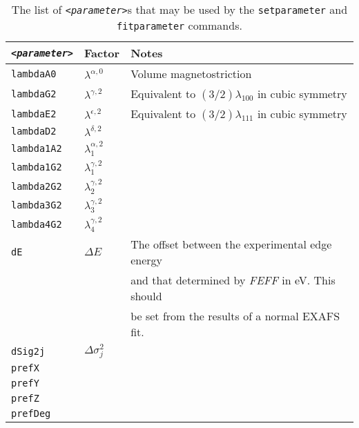 \documentclass[a4paper,12pt]{report}
\newcommand{\feff}{\emph{FEFF} }
\begin{document}
\begin{table}
\begin{tabular}{lll}
\texttt{\emph{<parameter>}} & Factor & Notes \\
\hline
 \verb|lambdaA0| & $\lambda^{\alpha,0}$ & Volume magnetostriction \\
 \verb|lambdaG2| & $\lambda^{\gamma,2}$ & Equivalent to $(3/2)\lambda_{100}$ in cubic symmetry \\
 \verb|lambdaE2| & $\lambda^{\epsilon,2}$ & Equivalent to $(3/2)\lambda_{111}$ in cubic symmetry \\
 \verb|lambdaD2| & $\lambda^{\delta,2}$ & \\
 \verb|lambda1A2| & $\lambda_1^{\alpha,2}$ & \\
 \verb|lambda1G2| & $\lambda_1^{\gamma,2}$ & \\
 \verb|lambda2G2| & $\lambda_2^{\gamma,2}$ & \\
 \verb|lambda3G2| & $\lambda_3^{\gamma,2}$ & \\
 \verb|lambda4G2| & $\lambda_4^{\gamma,2}$ & \\
 \verb|dE| & $\Delta E$ & The offset between the experimental edge energy \\
& & and that determined by \feff in eV. This should\\
& & be set from the results of a normal EXAFS fit.\\

 \verb|dSig2j| & $\Delta\sigma_j^2$ \\
 \verb|prefX| & \\
 \verb|prefY| & \\
 \verb|prefZ| & \\
 \verb|prefDeg| & \\
\end{tabular}
\label{table:parameterlist}
\caption{The list of \texttt{\emph{<parameter>}}s that may be used by the \texttt{setparameter} and \texttt{fitparameter} commands.}
\end{table}
\end{document}

